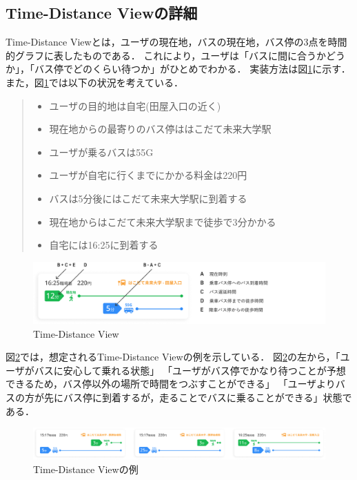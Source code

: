 \subsection{Time-Distance Viewの詳細}
    Time-Distance Viewとは，ユーザの現在地，バスの現在地，バス停の3点を時間的グラフに表したものである．
    これにより，ユーザは「バスに間に合うかどうか」，「バス停でどのくらい待つか」がひとめでわかる．
    実装方法は図\ref{fig:feature_timedistanceview}に示す．
    また，図\ref{fig:feature_timedistanceview}では以下の状況を考えている．
    \pagebreak
    \begin{quote}
        \begin{itemize}
            \item ユーザの目的地は自宅(田屋入口の近く)
            \item 現在地からの最寄りのバス停ははこだて未来大学駅
            \item ユーザが乗るバスは55G
            \item ユーザが自宅に行くまでにかかる料金は220円
            \item バスは5分後にはこだて未来大学駅に到着する
            \item 現在地からはこだて未来大学駅まで徒歩で3分かかる
            \item 自宅には16:25に到着する
        \end{itemize}
    \end{quote}
    \begin{figure}
        \centering
        \includegraphics[width=14cm]{images/feature_timedistanceview.png}
        \caption{Time-Distance View}
        \label{fig:feature_timedistanceview}
    \end{figure}
    \pagebreak
    図\ref{fig:feature_timedistanceview2}では，想定されるTime-Distance Viewの例を示している．
    図\ref{fig:feature_timedistanceview2}の左から，「ユーザがバスに安心して乗れる状態」
    「ユーザがバス停でかなり待つことが予想できるため，バス停以外の場所で時間をつぶすことができる」
    「ユーザよりバスの方が先にバス停に到着するが，走ることでバスに乗ることができる」状態である．
    \pagebreak
    \begin{figure}
        \centering
        \includegraphics[width=14cm]{images/feature_timedistanceview2.png}
        \caption{Time-Distance Viewの例}
        \label{fig:feature_timedistanceview2}
    \end{figure}

